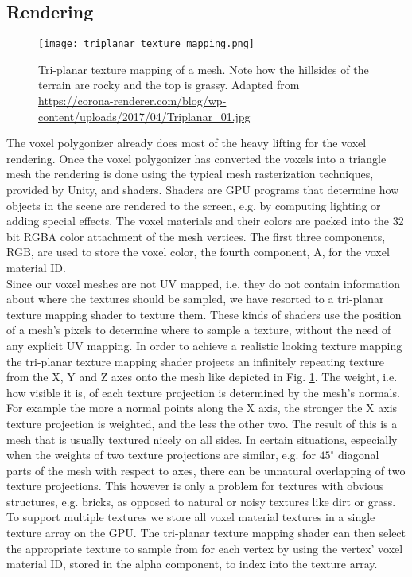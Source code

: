 \subsection{Rendering}
\label{sec:voxel_rendering}

\begin{figure}
\centering
\captionsetup{width=0.8\textwidth}
\texttt{[image: triplanar\_texture\_mapping.png]}
\caption{Tri-planar texture mapping of a mesh. Note how the hillsides of the terrain are rocky and the top is grassy.
Adapted from \url{https://corona-renderer.com/blog/wp-content/uploads/2017/04/Triplanar_01.jpg}}
\label{fig:triplanar_texture_mapping}
\end{figure}

The voxel polygonizer already does most of the heavy lifting for the voxel rendering. Once the voxel polygonizer has converted the voxels into a triangle mesh the rendering is done using the typical mesh rasterization techniques, provided by Unity, and shaders. Shaders are GPU programs that determine how objects in the scene are rendered to the screen, e.g. by computing lighting or adding special effects. The voxel materials and their colors are packed into the 32 bit RGBA color attachment of the mesh vertices. The first three components, RGB, are used to store the voxel color, the fourth component, A, for the voxel material ID.\\
Since our voxel meshes are not UV mapped, i.e. they do not contain information about where the textures should be sampled, we have resorted to a tri-planar texture mapping shader to texture them. These kinds of shaders use the position of a mesh's pixels to determine where to sample a texture, without the need of any explicit UV mapping. In order to achieve a realistic looking texture
mapping the tri-planar texture mapping shader projects an infinitely repeating texture from the X, Y and Z axes onto the mesh
like depicted in Fig. \ref{fig:triplanar_texture_mapping}. The weight, i.e. how visible it is, of each texture projection is determined by the mesh's normals. For example the more a normal points along the X axis, the stronger the X axis texture projection is weighted, and the less the other two. The result of this is a mesh
that is usually textured nicely on all sides. In certain situations, especially when the weights of two texture projections are similar, e.g. for $45^{\circ}$ diagonal parts of the mesh with respect to axes, there can be unnatural overlapping of two texture projections. This however is only a problem for textures with obvious structures, e.g. bricks, as opposed to natural or noisy textures like dirt or grass. To support multiple textures we store all voxel material textures in a single texture array on the GPU. The tri-planar texture mapping shader can then select the appropriate texture to sample from for each vertex by using the vertex' voxel material ID, stored in the alpha component, to index into the texture array.

